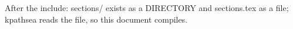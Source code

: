 \documentclass{article}
\begin{document}

After the include: sections/ exists as a DIRECTORY and sections.tex as a
file; kpathsea reads the file, so this document compiles.
\end{document}
